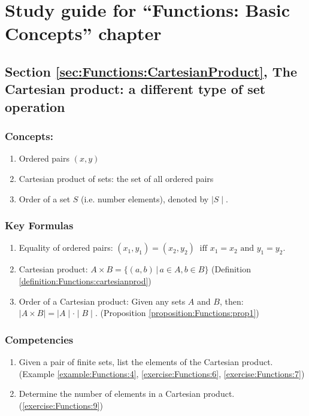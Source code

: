 \section{Study guide  for ``Functions: Basic Concepts''  chapter}
\label{sec:Functions:StudyGuide} 

\subsection*{Section \ref{sec:Functions:CartesianProduct}, The Cartesian product: a different type of set operation}
\subsubsection*{Concepts:}
\begin{enumerate}
\item 
Ordered pairs $(x, y)$
\item
Cartesian product of sets: the set of all ordered pairs
\item
Order of a set $S$ (i.e. number elements), denoted by $\mid S\mid $.
\end{enumerate}

\subsubsection*{Key Formulas}
\begin{enumerate}
\item
Equality of ordered pairs: $(x_{1}, y_{1}) = (x_{2}, y_{2})~ \mbox{ iff }  x_{1} = x_{2} \mbox{ and } y_{1} = y_{2}.$
\item
Cartesian product: $A \times B = \{ (a, b) \, | \, a \in A, b \in B \}$  (Definition \ref{definition:Functions:cartesianprod})
\item
Order of a Cartesian product: Given any sets $A$ and $B$, then: \\ $\mid A \times B \mid = \mid A \mid \cdot \mid B \mid. $ (Proposition \ref{proposition:Functions:prop1})
\end{enumerate}

\subsubsection*{Competencies}
\begin{enumerate}
\item
Given a pair of finite sets, list the elements of the Cartesian product. (Example \ref{example:Functions:4}, \ref{exercise:Functions:6}, \ref{exercise:Functions:7})
\item
Determine the number of elements in a Cartesian product. (\ref{exercise:Functions:9})
\end{enumerate}


